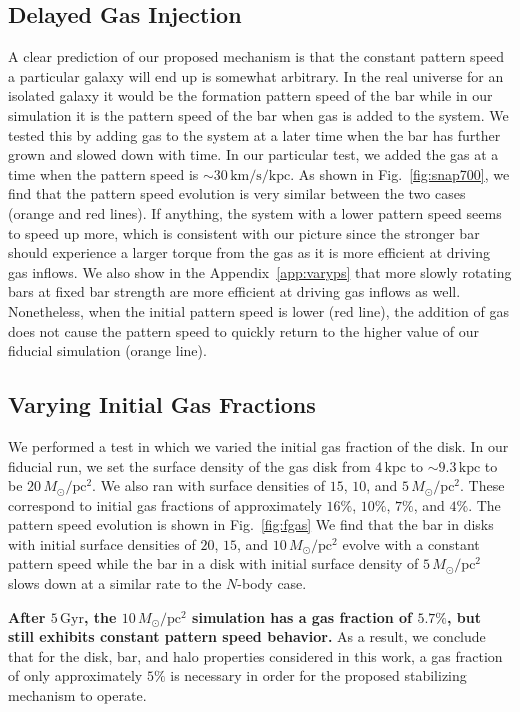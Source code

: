 \documentclass[twocolumn,linenumbers,trackchanges]{aastex631}
\newcommand{\Nbody}{$N$-body}
\newcommand{\Msun}{\ensuremath{M_{\odot}}}
\begin{document}
\subsection{Delayed Gas Injection}
A clear prediction of our proposed mechanism is that the constant pattern speed
a particular galaxy will end up is somewhat arbitrary. In the real universe for
an isolated galaxy it would be the formation pattern speed of the bar while in
our simulation it is the pattern speed of the bar when gas is added to the
system. We tested this by adding gas to the system at a later time when the bar
has further grown and slowed down with time. In our particular test, we added
the gas at a time when the pattern speed is
$\sim30\,\textrm{km}/\textrm{s}/\textrm{kpc}$. As shown in
Fig.~\ref{fig:snap700}, we find that the pattern speed evolution is very similar
between the two cases (orange and red lines). If anything, the system with a
lower pattern speed seems to speed up more, which is consistent with our picture
since the stronger bar should experience a larger torque from the gas as it is
more efficient at driving gas inflows. We also show in the
Appendix~\ref{app:varyps} that more slowly rotating bars at fixed bar strength
are more efficient at driving gas inflows as well. Nonetheless, when the initial
pattern speed is lower (red line), the addition of gas does not cause the
pattern speed to quickly return to the higher value of our fiducial simulation
(orange line).



\subsection{Varying Initial Gas Fractions}
We performed a test in which we varied the initial gas fraction of the
disk. In our fiducial run, we set the surface density of the gas disk from
$4\,\textrm{kpc}$ to $\sim9.3\,\textrm{kpc}$ to be $20\,\Msun/\textrm{pc}^2$.
We also ran with surface densities of $15$, $10$, and
$5\,\Msun/\textrm{pc}^2$. These correspond to initial gas fractions of
approximately $16\%$, $10\%$, $7\%$, and $4\%$. The pattern speed evolution is
shown in Fig.~\ref{fig:fgas} We find that the bar in disks with
initial surface densities of $20$, $15$, and $10\,\Msun/\textrm{pc}^2$ evolve
with a constant pattern speed while the bar in a disk with initial surface
density of $5\,\Msun/\textrm{pc}^2$ slows down at a similar rate to the \Nbody{} case.

{\bf After $5\,\textrm{Gyr}$, the $10\,\Msun/\textrm{pc}^2$ simulation has a gas
fraction of $5.7\%$, but still exhibits constant pattern speed behavior.} As a
result, we conclude that for the disk, bar, and halo properties considered in
this work, a gas fraction of only approximately $5\%$ is necessary in order for
the proposed stabilizing mechanism to operate.
\end{document}
